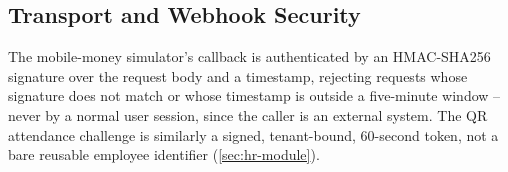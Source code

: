 
\subsection{Transport and Webhook Security}
The mobile-money simulator's callback is authenticated by an HMAC-SHA256
signature over the request body and a timestamp, rejecting requests whose
signature does not match or whose timestamp is outside a five-minute window
-- never by a normal user session, since the caller is an external system.
The QR attendance challenge is similarly a signed, tenant-bound, 60-second
token, not a bare reusable employee identifier (\cref{sec:hr-module}).
